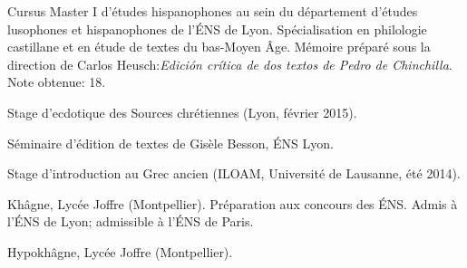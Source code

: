 \begin{rubric}{Cursus}
                                \entry*[2014-2015]
                            Master I d'études hispanophones au sein du département d'études
                        lusophones et hispanophones de l'ÉNS de Lyon. Spécialisation en philologie
                        castillane et en étude de textes du bas-Moyen Âge. Mémoire préparé sous la
                        direction de Carlos Heusch:\textit{Edición crítica de dos textos de Pedro de
                        Chinchilla}. Note obtenue: 18.
                    
                                \entry*
                            Stage d’ecdotique des Sources chrétiennes (Lyon, février
                        2015).
                    
                                \entry*[2013-2014]
                            Séminaire d’édition de textes de Gisèle Besson, ÉNS Lyon.
                    
                                \entry*
                            Stage d'introduction au Grec ancien (ILOAM, Université de Lausanne,
                        été 2014).
                    
                                \entry*[2012-2013]
                            Khâgne, Lycée Joffre (Montpellier). Préparation aux concours des ÉNS.
                        Admis à l'ÉNS de Lyon; admissible à l'ÉNS de Paris.
                    
                                \entry*[2011-2012]
                            Hypokhâgne, Lycée Joffre (Montpellier).
                    \end{rubric}





